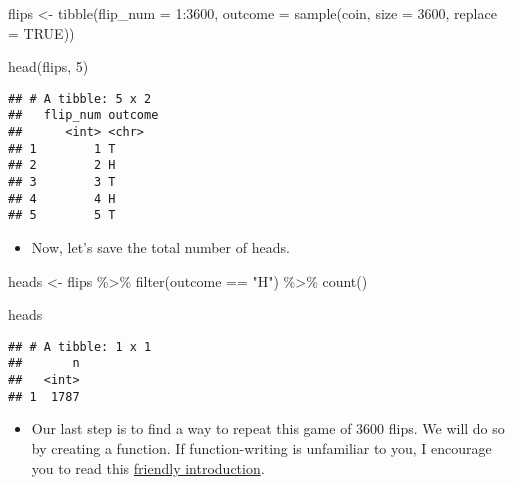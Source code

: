 \documentclass[
]{book}
\newenvironment{Shaded}{\begin{snugshade}}{\end{snugshade}}
\newcommand{\AttributeTok}[1]{\textcolor[rgb]{0.77,0.63,0.00}{#1}}
\newcommand{\ConstantTok}[1]{\textcolor[rgb]{0.00,0.00,0.00}{#1}}
\newcommand{\DecValTok}[1]{\textcolor[rgb]{0.00,0.00,0.81}{#1}}
\newcommand{\FunctionTok}[1]{\textcolor[rgb]{0.00,0.00,0.00}{#1}}
\newcommand{\NormalTok}[1]{#1}
\newcommand{\OtherTok}[1]{\textcolor[rgb]{0.56,0.35,0.01}{#1}}
\newcommand{\SpecialCharTok}[1]{\textcolor[rgb]{0.00,0.00,0.00}{#1}}
\newcommand{\StringTok}[1]{\textcolor[rgb]{0.31,0.60,0.02}{#1}}
\providecommand{\tightlist}{%
  \setlength{\itemsep}{0pt}\setlength{\parskip}{0pt}}
\begin{document}
\begin{Shaded}
\begin{Highlighting}[]
\NormalTok{flips }\OtherTok{\textless{}{-}} \FunctionTok{tibble}\NormalTok{(}\AttributeTok{flip\_num =} \DecValTok{1}\SpecialCharTok{:}\DecValTok{3600}\NormalTok{, }
                \AttributeTok{outcome =} \FunctionTok{sample}\NormalTok{(coin, }\AttributeTok{size =} \DecValTok{3600}\NormalTok{, }\AttributeTok{replace =} \ConstantTok{TRUE}\NormalTok{))}

\FunctionTok{head}\NormalTok{(flips, }\DecValTok{5}\NormalTok{)}
\end{Highlighting}
\end{Shaded}

\begin{verbatim}
## # A tibble: 5 x 2
##   flip_num outcome
##      <int> <chr>  
## 1        1 T      
## 2        2 H      
## 3        3 T      
## 4        4 H      
## 5        5 T
\end{verbatim}

\begin{itemize}
\tightlist
\item
  Now, let's save the total number of heads.
\end{itemize}

\begin{Shaded}
\begin{Highlighting}[]
\NormalTok{heads }\OtherTok{\textless{}{-}}\NormalTok{ flips }\SpecialCharTok{\%\textgreater{}\%} 
  \FunctionTok{filter}\NormalTok{(outcome }\SpecialCharTok{==} \StringTok{"H"}\NormalTok{) }\SpecialCharTok{\%\textgreater{}\%} 
  \FunctionTok{count}\NormalTok{()}

\NormalTok{heads}
\end{Highlighting}
\end{Shaded}

\begin{verbatim}
## # A tibble: 1 x 1
##       n
##   <int>
## 1  1787
\end{verbatim}

\begin{itemize}
\tightlist
\item
  Our last step is to find a way to repeat this game of 3600 flips. We will do so by creating a function. If function-writing is unfamiliar to you, I encourage you to read this \href{https://r4ds.had.co.nz/functions.html}{friendly introduction}.
\end{itemize}
\end{document}
